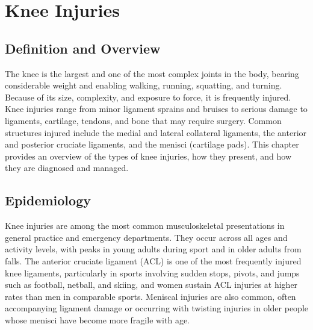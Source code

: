 \chapter{Knee Injuries}

\section*{Definition and Overview}
The knee is the largest and one of the most complex joints in the body, bearing considerable weight and enabling walking, running, squatting, and turning. Because of its size, complexity, and exposure to force, it is frequently injured. Knee injuries range from minor ligament sprains and bruises to serious damage to ligaments, cartilage, tendons, and bone that may require surgery. Common structures injured include the medial and lateral collateral ligaments, the anterior and posterior cruciate ligaments, and the menisci (cartilage pads). This chapter provides an overview of the types of knee injuries, how they present, and how they are diagnosed and managed.

\section*{Epidemiology}
Knee injuries are among the most common musculoskeletal presentations in general practice and emergency departments. They occur across all ages and activity levels, with peaks in young adults during sport and in older adults from falls. The anterior cruciate ligament (ACL) is one of the most frequently injured knee ligaments, particularly in sports involving sudden stops, pivots, and jumps such as football, netball, and skiing, and women sustain ACL injuries at higher rates than men in comparable sports. Meniscal injuries are also common, often accompanying ligament damage or occurring with twisting injuries in older people whose menisci have become more fragile with age.

